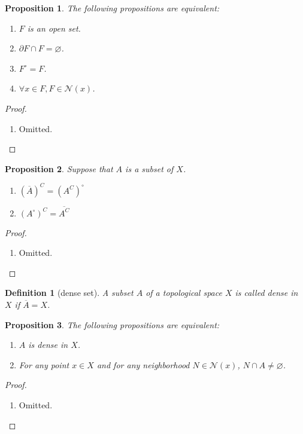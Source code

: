 \documentclass{report}
\newtheorem{definition}{Definition}[section]
\newtheorem{proposition}{Proposition}[section]
\theoremstyle{nonumberplain}
\newtheorem{proof}{Proof.}
\begin{document}
\begin{proposition}
	The following propositions are equivalent:
	\begin{enumerate}
		\item $F$ is an open set.	
		\item $\partial F\cap F=\varnothing$.
		\item $F^\circ=F$.
		\item $\forall x\in F,F\in \mathcal{N}(x)$.
	\end{enumerate}
\end{proposition}
\begin{proof}~\\ \vspace{-1em}
	\begin{enumerate}	
		\item Omitted.
	\end{enumerate}
\end{proof}

\begin{proposition}
	Suppose that $A$ is a subset of $X$.
	\begin{enumerate}	
		\item $(\overline{A})^C=(A^C)^{\circ}$
		\item $(A^{\circ})^C=\overline{A^C}$
	\end{enumerate}
\end{proposition}
\begin{proof}~\\ \vspace{-1em}
	\begin{enumerate}	
		\item Omitted.
	\end{enumerate}
\end{proof}

\begin{definition}[dense set]
	A subset $A$ of a topological space $X$ is called dense in $X$ if  $\overline{A}=X$.
\end{definition}
\begin{proposition}
	The following propositions are equivalent:
	\begin{enumerate}
		\item $A$ is dense in $X$.	
		\item For any point $x \in X$ and for any neighborhood $N\in\mathcal{N}(x)$, $N\cap A\ne \varnothing$.
	\end{enumerate}
\end{proposition}
\begin{proof}~\\ \vspace{-1em}
	\begin{enumerate}	
		\item Omitted.
	\end{enumerate}
\end{proof}
\end{document}
